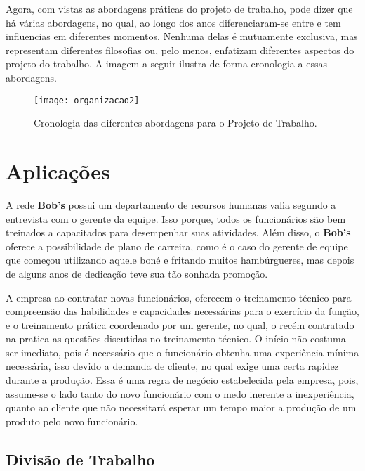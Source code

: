 		Agora, com vistas as abordagens práticas do projeto de trabalho, pode dizer que há várias abordagens, no qual, ao longo dos anos diferenciaram-se entre e tem influencias em diferentes momentos. Nenhuma delas é mutuamente exclusiva, mas representam diferentes filosofias ou, pelo menos, enfatizam diferentes aspectos do projeto do trabalho. A imagem a seguir ilustra de forma cronologia a essas abordagens.

		\begin{figure}[h]
			\centering
			\texttt{[image: organizacao2]}
			\caption[Cronologia das diferentes abordagens para o Projeto de Trabalho]{Cronologia das diferentes abordagens para o Projeto de Trabalho. \cite{slack}}
			\label{fig:organizacao2}
		\end{figure}

	\section[Aplicações]{Aplicações}
	\label{sec:organizacao_aplicacoes}

		A rede \textbf{Bob’s} possui um departamento de recursos humanas valia segundo a entrevista com o gerente da equipe. Isso porque, todos os funcionários são bem treinados a capacitados para desempenhar suas atividades. Além disso, o \textbf{Bob’s} oferece a possibilidade de plano de carreira, como é o caso do gerente de equipe que começou utilizando aquele boné e fritando muitos hambúrgueres, mas depois de alguns anos de dedicação teve sua tão sonhada promoção. 
		
		A empresa ao contratar novas funcionários, oferecem o treinamento técnico para compreensão das habilidades e capacidades necessárias para o exercício da função, e o treinamento prática coordenado por um gerente, no qual, o recém contratado na pratica as questões discutidas no treinamento técnico. O início não costuma ser imediato, pois é necessário que o funcionário obtenha uma experiência mínima necessária, isso devido a demanda de cliente, no qual exige uma certa rapidez durante a produção. Essa é uma regra de negócio estabelecida pela empresa, pois, assume-se o lado tanto do novo funcionário com o medo inerente a inexperiência, quanto ao cliente que não necessitará esperar um tempo maior a produção de um produto pelo novo funcionário.

		\subsection[Divisão de Trabalho]{Divisão de Trabalho}
		\label{sec:organizacao_dt}

